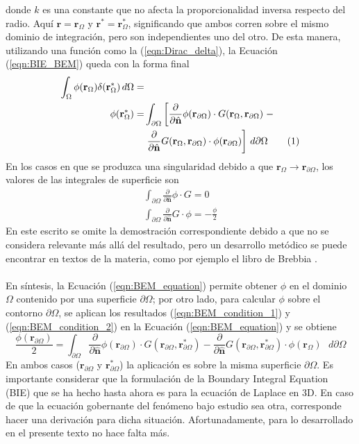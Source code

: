 \documentclass[12pt, oneside, numbers, spanish]{ezthesis}
\newcommand\numberthis{\addtocounter{equation}{1}\tag{\theequation}}
\numberwithin{equation}{section}
\begin{document}
donde $k$ es una constante que no afecta la proporcionalidad inversa respecto del radio. Aquí $\mathbf{r} = \mathbf{r}_\Omega$ y $\mathbf{r}^* = \mathbf{r}_\Omega^*$, significando que ambos corren sobre el mismo dominio de integración, pero son independientes uno del otro. De esta manera, utilizando una función como la (\ref{eqn:Dirac_delta}), la Ecuación (\ref{eqn:BIE_BEM}) queda con la forma final
\begin{align*}
\int_\Omega\phi(\mathbf{r}_\Omega)\delta(\mathbf{r}_\Omega^*)\, d\Omega=&\\
\phi(\mathbf{r}_\Omega^*)=&\int_{\partial\Omega}\left[\frac{\partial}{\partial\hat{\mathbf{n}}}\phi(\mathbf{r}_{\partial\Omega})\cdot G(\mathbf{r}_\Omega,\mathbf{r}_{\partial\Omega})\right. -\\ &\left.\frac{\partial}{\partial\hat{\mathbf{n}}}G(\mathbf{r}_\Omega,\mathbf{r}_{\partial\Omega})\cdot\phi(\mathbf{r}_{\partial\Omega})\right]\, d\partial\Omega \numberthis \label{eqn:BEM_equation}
\end{align*}
En los casos en que se produzca una singularidad debido a que $\mathbf{r}_\Omega \rightarrow \mathbf{r}_{\partial\Omega}$, los valores de las integrales de superficie son
\begin{gather}
\int_{\partial\Omega}\frac{\partial}{\partial\hat{\mathbf{n}}}\phi\cdot G = 0 \label{eqn:BEM_condition_1} \\
\int_{\partial\Omega}\frac{\partial}{\partial\hat{\mathbf{n}}} G\cdot\phi = -\frac{\phi}{2} \label{eqn:BEM_condition_2}
\end{gather}
En este escrito se omite la demostración correspondiente debido a que no se considera relevante más allá del resultado, pero un desarrollo metódico se puede encontrar en textos de la materia, como por ejemplo el libro de Brebbia \cite{Brebbia}.\\\\
En síntesis, la Ecuación (\ref{eqn:BEM_equation}) permite obtener $\phi$ en el dominio $\Omega$ contenido por una superficie $\partial\Omega$; por otro lado, para calcular $\phi$ sobre el contorno $\partial\Omega$, se aplican los resultados (\ref{eqn:BEM_condition_1}) y (\ref{eqn:BEM_condition_2}) en la Ecuación (\ref{eqn:BEM_equation}) y se obtiene
\begin{equation}
\frac{\phi(\mathbf{r}_{\partial\Omega})}{2} = \int_{\partial\Omega}\frac{\partial}{\partial\hat{\mathbf{n}}}\phi(\mathbf{r}_{\partial\Omega})\cdot G(\mathbf{r}_{\partial\Omega},\mathbf{r}_{\partial\Omega}^*) - \frac{\partial}{\partial\hat{\mathbf{n}}}G(\mathbf{r}_{\partial\Omega},\mathbf{r}_{\partial\Omega}^*)\cdot\phi(\mathbf{r}_\Omega)\text{ }d\partial\Omega
\end{equation}
En ambos casos ($\mathbf{r}_{\partial\Omega}$ y $\mathbf{r}_{\partial\Omega}^*$) la aplicación es sobre la misma superficie $\partial\Omega$. Es importante considerar que la formulación de la Boundary Integral Equation (BIE) que se ha hecho hasta ahora es para la ecuación de Laplace en 3D. En caso de que la ecuación gobernante del fenómeno bajo estudio sea otra, corresponde hacer una derivación para dicha situación. Afortunadamente, para lo desarrollado en el presente texto no hace falta más.
\end{document}
